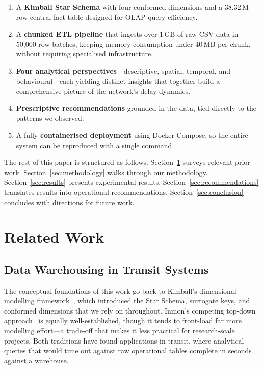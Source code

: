 \documentclass[conference]{IEEEtran}
\begin{document}
\begin{enumerate}
  \item A \textbf{Kimball Star Schema} with four conformed dimensions and
        a 38.32\,M-row central fact table designed for OLAP query efficiency.
  \item A \textbf{chunked ETL pipeline} that ingests over 1\,GB of raw
        CSV data in 50,000-row batches, keeping memory consumption under
        40\,MB per chunk, without requiring specialised infrastructure.
  \item \textbf{Four analytical perspectives}---descriptive, spatial,
        temporal, and behavioural---each yielding distinct insights that
        together build a comprehensive picture of the network's delay
        dynamics.
  \item \textbf{Prescriptive recommendations} grounded in the data, tied
        directly to the patterns we observed.
  \item A fully \textbf{containerised deployment} using Docker Compose,
        so the entire system can be reproduced with a single command.
\end{enumerate}

The rest of this paper is structured as follows.
Section~\ref{sec:related} surveys relevant prior work.
Section~\ref{sec:methodology} walks through our methodology.
Section~\ref{sec:results} presents experimental results.
Section~\ref{sec:recommendations} translates results into operational
recommendations.
Section~\ref{sec:conclusion} concludes with directions for future work.

\section{Related Work}
\label{sec:related}

\subsection{Data Warehousing in Transit Systems}

The conceptual foundations of this work go back to Kimball's dimensional
modelling framework~\cite{b2}, which introduced the Star Schema, surrogate
keys, and conformed dimensions that we rely on throughout.
Inmon's competing top-down approach~\cite{b4} is equally well-established,
though it tends to front-load far more modelling effort---a trade-off that
makes it less practical for research-scale projects.
Both traditions have found applications in transit, where analytical
queries that would time out against raw operational tables complete in
seconds against a warehouse.
\end{document}
